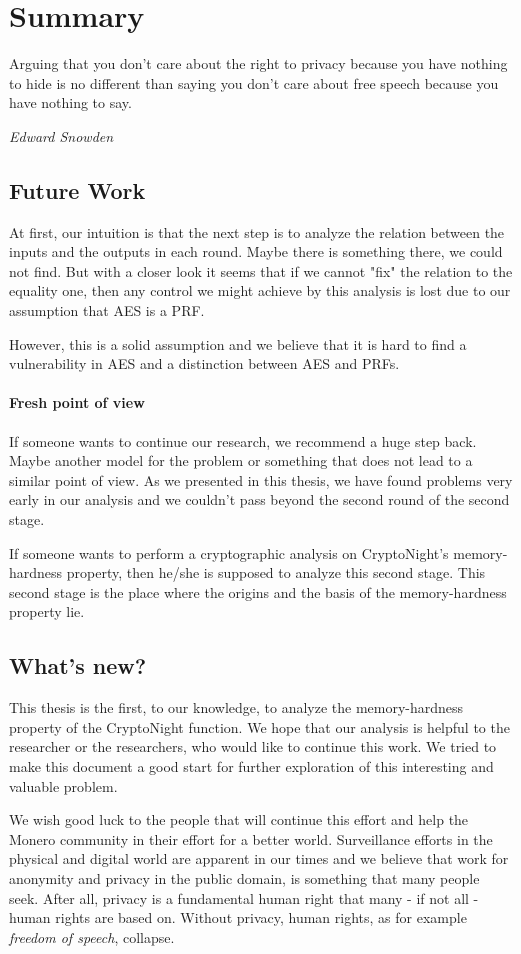 \chapter{Summary}
%
\epigraph{Arguing that you don't care about the right to privacy because you have nothing to hide is no different than saying you don't care about free speech because you have nothing to say.}{\textit{Edward Snowden}}
%
\section{Future Work}
At first, our intuition is that the next step is to analyze the relation between the inputs and the outputs in each round. Maybe there is something there, we could not find. But with a closer look it seems that if we cannot "fix" the relation to the equality one, then any control we might achieve by this analysis is lost due to our assumption that AES is a PRF.

However, this is a solid assumption and we believe that it is hard to find a vulnerability in AES and a distinction between AES and PRFs.

\subsubsection{Fresh point of view}
If someone wants to continue our research, we recommend a huge step back. Maybe another model for the problem or something that does not lead to a similar point of view. As we presented in this thesis, we have found problems very early in our analysis and we couldn't pass beyond the second round of the second stage.

If someone wants to perform a cryptographic analysis on CryptoNight's memory-hardness property, then he/she is supposed to analyze this second stage. This second stage is the place where the origins and the basis of the memory-hardness property lie.

\section{What's new?}
This thesis is the first, to our knowledge, to analyze the memory-hardness property of the CryptoNight function. We hope that our analysis is helpful to the researcher or the researchers, who would like to continue this work. We tried to make this document a good start for further exploration of this interesting and valuable problem.

We wish good luck to the people that will continue this effort and help the Monero community in their effort for a better world. Surveillance efforts in the physical and digital world are apparent in our times and we believe that work for anonymity and privacy in the public domain, is something that many people seek. After all, privacy is a fundamental human right that many - if not all - human rights are based on. Without privacy, human rights, as for example \emph{freedom of speech}, collapse.
